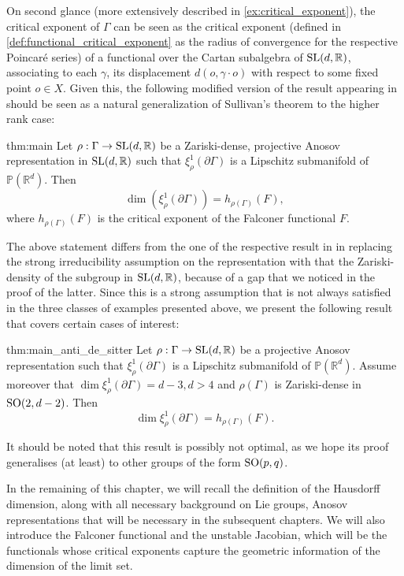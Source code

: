 \documentclass{report}
\begin{document}
On second glance (more extensively described in \cref{ex:critical_exponent}), the critical exponent of $\Gamma$ can be seen as the critical exponent (defined in \cref{def:functional_critical_exponent} as the radius of convergence for the respective Poincaré series) of a functional over the Cartan subalgebra of $\operatorname{{\mathrm{SL}}}(d, \mathbb R)$, associating to each $\gamma$, its displacement $d(o, \gamma \cdot o)$ with respect to some fixed point $o \in X$.
Given this, the following modified version of the result appearing in \cite{pozzetti_anosov_2023} should be seen as a natural generalization of Sullivan's theorem to the higher rank case:
\begin{reptheorem}{thm:main}
    Let $\rho: \Gamma \to \operatorname{{\mathrm{SL}}}(d, \mathbb R)$ be a Zariski-dense, projective Anosov representation in $\operatorname{{\mathrm{SL}}}(d, \mathbb R)$ such that $\xi^1_\rho(\partial \Gamma)$ is a Lipschitz submanifold of $\mathbb P(\mathbb R^d)$.
    Then
    \[
        \dim(\xi^1_\rho(\partial \Gamma)) = h_{\rho(\Gamma)}(F),
    \]
    where $h_{\rho(\Gamma)}(F)$ is the critical exponent of the Falconer functional $F$.
\end{reptheorem}
The above statement differs from the one of the respective result in \cite{pozzetti_anosov_2023} in replacing the strong irreducibility assumption on the representation with that the Zariski-density of the subgroup in $\operatorname{{\mathrm{SL}}}(d, \mathbb R)$, because of a gap that we noticed in the proof of the latter.
Since this is a strong assumption that is not always satisfied in the three classes of examples presented above, we present the following result that covers certain cases of interest:
\begin{reptheorem}{thm:main_anti_de_sitter}
    Let $\rho: \Gamma \to \operatorname{{\mathrm{SL}}}(d, \mathbb R)$ be a projective Anosov representation such that $\xi^1_\rho(\partial \Gamma)$ is a Lipschitz submanifold of $\mathbb P(\mathbb R^d)$.
    Assume moreover that $\dim \xi_\rho^1(\partial \Gamma) = d-3, d > 4$ and $\rho(\Gamma)$ is Zariski-dense in $\operatorname{{\mathrm{SO}}}(2,d-2)$. 
    Then
    \[
        \dim \xi_\rho^1(\partial \Gamma) = h_{\rho(\Gamma)}(F).
    \]
\end{reptheorem}
It should be noted that this result is possibly not optimal, as we hope its proof generalises (at least) to other groups of the form $\operatorname{{\mathrm{SO}}}(p,q)$.

In the remaining of this chapter, we will recall the definition of the Hausdorff dimension, along with all necessary background on Lie groups, Anosov representations that will be necessary in the subsequent chapters.
We will also introduce the Falconer functional and the unstable Jacobian, which will be the functionals whose critical exponents capture the geometric information of the dimension of the limit set.
\end{document}
